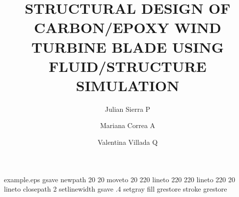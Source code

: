 %
%
%
%
%
\begin{filecontents*}{example.eps}
gsave
newpath
  20 20 moveto
  20 220 lineto
  220 220 lineto
  220 20 lineto
closepath
2 setlinewidth
gsave
  .4 setgray fill
grestore
stroke
grestore
\end{filecontents*}
%
\RequirePackage{fix-cm}
%
\documentclass[twocolumn]{svjour3}          %
%
\smartqed  %
%
\usepackage{graphicx}
%
%
%
%
%


\title{STRUCTURAL DESIGN OF CARBON/EPOXY WIND TURBINE BLADE USING FLUID/STRUCTURE SIMULATION%
}


\author{Julian Sierra P \and Mariana Correa A        \and
        Valentina Villada Q %
}



